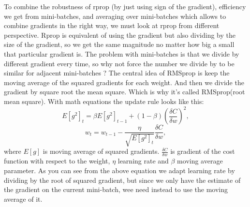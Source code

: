 To combine the robustness of rprop (by just using sign of the gradient), efficiency we get 
from mini-batches, and averaging over mini-batches which allows to combine gradients in the
right way, we must look at rprop from different perspective.
Rprop is equivalent of using the gradient but also dividing by the size of the gradient,
so we get the same magnitude no matter how big a small that particular gradient is.
The problem with mini-batches is that we divide by different gradient every time, so why not force
the number we divide by to be similar for adjacent mini-batches ?
The central idea of RMSprop is keep the moving average of the squared gradients for each weight.
And then we divide the gradient by square root the mean square. 
Which is why it’s called RMSprop(root mean square). With math equations the update rule
looks like this:
\begin{equation}
	\label{equ:rmsprop1}
	E[g^{2}]_{t} = \beta E[g^{2}]_{t-1}+(1-\beta)(\frac{\delta C}{\delta w})^{2},
\end{equation}
\begin{equation}
	\label{equ:rmsprop2}
	w_{t} = w_{t-1} - \frac{\eta}{\sqrt{E[g^{2}]_{t}}} \frac{\delta C}{\delta w},
\end{equation}
where $E[g]$ is moving average of squared gradients. $\frac{\delta C}{\delta w}$ is gradient of
the cost function with respect to the weight, $\eta$  learning rate and $\beta$  moving average
parameter.
As you can see from the above equation we adapt learning rate by dividing by the root of
squared gradient, but since we only have the estimate of the gradient on the current mini-batch,
wee need instead to use the moving average of it.
